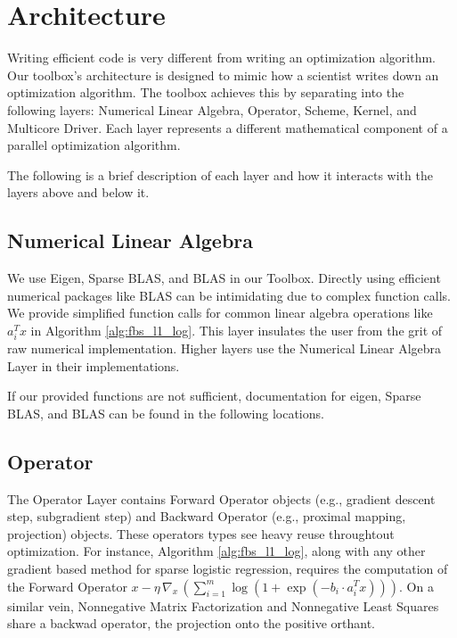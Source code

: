 \section{Architecture}


Writing efficient code is very different from writing an optimization algorithm.
Our toolbox's architecture is designed to mimic how a scientist writes down an optimization algorithm.
The toolbox achieves this by separating into the following layers: Numerical Linear Algebra, Operator, Scheme, Kernel, and Multicore Driver.
Each layer represents a different mathematical component of a parallel optimization algorithm.


The following is a brief description of each layer and how it interacts with the layers above and below it. 

\subsection{Numerical Linear Algebra}

We use Eigen, Sparse BLAS, and BLAS in our Toolbox. 
Directly using efficient numerical packages like BLAS can be intimidating due to complex function calls. We provide simplified function calls for common linear algebra operations like $a_i^T x$ in Algorithm \ref{alg:fbs_l1_log}. This layer insulates the user from the grit of raw numerical implementation. Higher layers use the Numerical Linear Algebra Layer in their implementations.


If our provided functions are not sufficient, documentation for eigen, Sparse BLAS, and BLAS can be found in the following locations. 

\subsection{Operator}

The Operator Layer contains Forward Operator objects (e.g., gradient descent step, subgradient step) and Backward Operator (e.g., proximal mapping, projection) objects. These operators types see heavy reuse throughtout optimization.
For instance, Algorithm \ref{alg:fbs_l1_log}, along with any other gradient based method for sparse logistic regression, requires the computation of the Forward Operator $x - \eta \, \nabla_x \,(\sum_{i = 1}^m \log (1 + \exp(-b_i \cdot a_i^T x)))$. On a similar vein, Nonnegative Matrix Factorization and Nonnegative Least Squares share a backwad operator, the projection onto the positive orthant.

